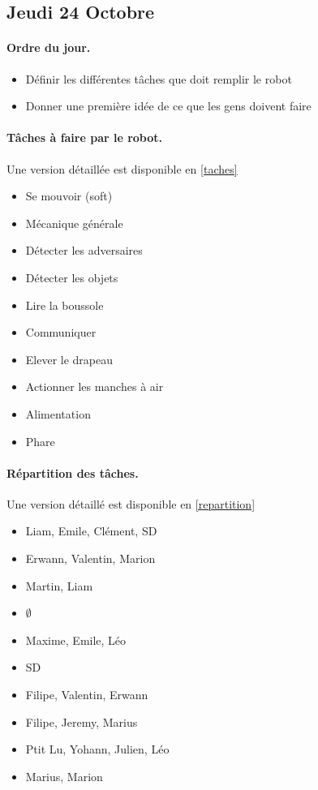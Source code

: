 \documentclass[a4paper,10pt]{report}
\begin{document}
\begin{spacing}{1.5}
\section*{Jeudi 24 Octobre}
\paragraph*{Ordre du jour.}
\begin{itemize}
\item Définir les différentes tâches que doit remplir le robot
\item Donner une première idée de ce que les gens doivent faire
\end{itemize}
\begin{multicols}{2}
\paragraph*{Tâches à faire par le robot.}
Une version détaillée est disponible en \ref{taches}
\begin{itemize}
\item Se mouvoir (soft)
\item Mécanique générale
\item Détecter les adversaires
\item Détecter les objets
\item Lire la boussole
\item Communiquer
\item Elever le drapeau
\item Actionner les manches à air
\item Alimentation
\item Phare
\end{itemize}
\columnbreak
\paragraph*{Répartition des tâches.}
Une version détaillé est disponible en \ref{repartition}
\begin{itemize}
\item Liam, Emile, Clément, SD
\item Erwann, Valentin, Marion
\item Martin, Liam
\item $\emptyset$
\item Maxime, Emile, Léo
\item SD
\item Filipe, Valentin, Erwann
\item Filipe, Jeremy, Marius
\item Ptit Lu, Yohann, Julien, Léo
\item Marius, Marion
\end{itemize}
\end{multicols}


\end{spacing}
\end{document}

